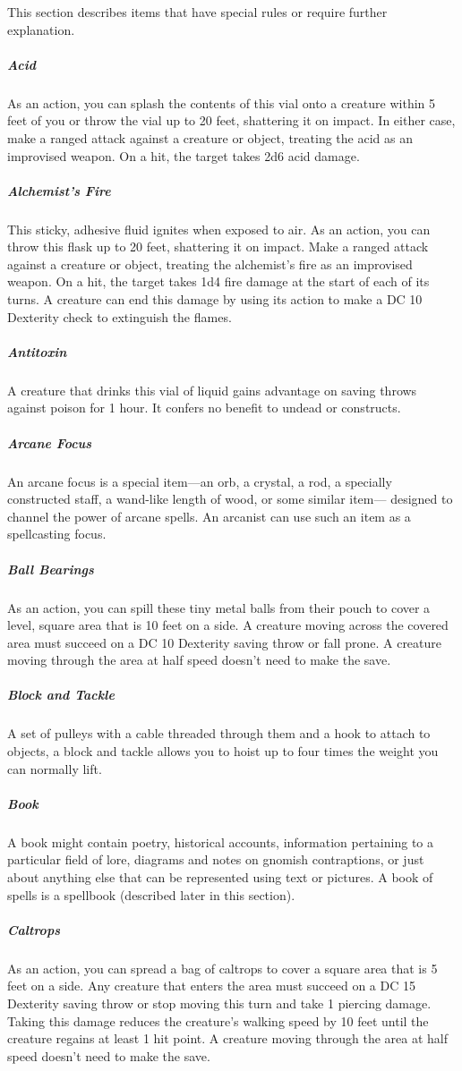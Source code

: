 This section describes items that have special rules or require further explanation.

\subparagraph*{Acid} As an action, you can splash the contents of this vial onto a creature within 5 feet of you or throw the vial up to 20 feet, shattering it on impact. In either case, make a ranged attack against a creature or object, treating the acid as an improvised weapon. On a hit, the target takes 2d6 acid damage.

\subparagraph*{Alchemist's Fire} This sticky, adhesive fluid ignites when exposed to air. As an action, you can throw this flask up to 20 feet, shattering it on impact. Make a ranged attack against a creature or object, treating the alchemist's fire as an improvised weapon. On a hit, the target takes 1d4 fire damage at the start of each of its turns. A creature can end this damage by using its action to make a DC 10 Dexterity check to extinguish the flames.

\subparagraph*{Antitoxin} A creature that drinks this vial of liquid gains advantage on saving throws against poison for 1 hour. It confers no benefit to undead or constructs.

\subparagraph*{Arcane Focus} An arcane focus is a special item—an orb, a crystal, a rod, a specially constructed staff, a wand-like length of wood, or some similar item— designed to channel the power of arcane spells. An arcanist can use such an item as a spellcasting focus.

\subparagraph*{Ball Bearings} As an action, you can spill these tiny metal balls from their pouch to cover a level, square area that is 10 feet on a side. A creature moving across the covered area must succeed on a DC 10 Dexterity saving throw or fall prone. A creature moving through the area at half speed doesn't need to make the save.

\subparagraph*{Block and Tackle} A set of pulleys with a cable threaded through them and a hook to attach to objects, a block and tackle allows you to hoist up to four times the weight you can normally lift.

\subparagraph*{Book} A book might contain poetry, historical accounts, information pertaining to a particular field of lore, diagrams and notes on gnomish contraptions, or just about anything else that can be represented using text or pictures. A book of spells is a spellbook (described later in this section).

\subparagraph*{Caltrops} As an action, you can spread a bag of caltrops to cover a square area that is 5 feet on a side. Any creature that enters the area must succeed on a DC 15 Dexterity saving throw or stop moving this turn and take 1 piercing damage. Taking this damage reduces the creature's walking speed by 10 feet until the creature regains at least 1 hit point. A creature moving through the area at half speed doesn't need to make the save.

